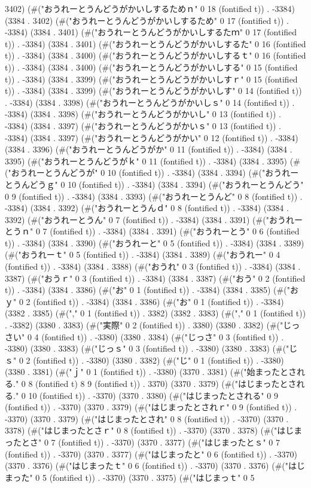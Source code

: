 3402) (#("おうれーとうんどうがかいしするためｎ" 0 18 (fontified t)) . -3384) (3384 . 3402) (#("おうれーとうんどうがかいしするため" 0 17 (fontified t)) . -3384) (3384 . 3401) (#("おうれーとうんどうがかいしするたｍ" 0 17 (fontified t)) . -3384) (3384 . 3401) (#("おうれーとうんどうがかいしするた" 0 16 (fontified t)) . -3384) (3384 . 3400) (#("おうれーとうんどうがかいしするｔ" 0 16 (fontified t)) . -3384) (3384 . 3400) (#("おうれーとうんどうがかいしする" 0 15 (fontified t)) . -3384) (3384 . 3399) (#("おうれーとうんどうがかいしすｒ" 0 15 (fontified t)) . -3384) (3384 . 3399) (#("おうれーとうんどうがかいしす" 0 14 (fontified t)) . -3384) (3384 . 3398) (#("おうれーとうんどうがかいしｓ" 0 14 (fontified t)) . -3384) (3384 . 3398) (#("おうれーとうんどうがかいし" 0 13 (fontified t)) . -3384) (3384 . 3397) (#("おうれーとうんどうがかいｓ" 0 13 (fontified t)) . -3384) (3384 . 3397) (#("おうれーとうんどうがかい" 0 12 (fontified t)) . -3384) (3384 . 3396) (#("おうれーとうんどうがか" 0 11 (fontified t)) . -3384) (3384 . 3395) (#("おうれーとうんどうがｋ" 0 11 (fontified t)) . -3384) (3384 . 3395) (#("おうれーとうんどうが" 0 10 (fontified t)) . -3384) (3384 . 3394) (#("おうれーとうんどうｇ" 0 10 (fontified t)) . -3384) (3384 . 3394) (#("おうれーとうんどう" 0 9 (fontified t)) . -3384) (3384 . 3393) (#("おうれーとうんど" 0 8 (fontified t)) . -3384) (3384 . 3392) (#("おうれーとうんｄ" 0 8 (fontified t)) . -3384) (3384 . 3392) (#("おうれーとうん" 0 7 (fontified t)) . -3384) (3384 . 3391) (#("おうれーとうｎ" 0 7 (fontified t)) . -3384) (3384 . 3391) (#("おうれーとう" 0 6 (fontified t)) . -3384) (3384 . 3390) (#("おうれーと" 0 5 (fontified t)) . -3384) (3384 . 3389) (#("おうれーｔ" 0 5 (fontified t)) . -3384) (3384 . 3389) (#("おうれー" 0 4 (fontified t)) . -3384) (3384 . 3388) (#("おうれ" 0 3 (fontified t)) . -3384) (3384 . 3387) (#("おうｒ" 0 3 (fontified t)) . -3384) (3384 . 3387) (#("おう" 0 2 (fontified t)) . -3384) (3384 . 3386) (#("お" 0 1 (fontified t)) . -3384) (3384 . 3385) (#("おｙ" 0 2 (fontified t)) . -3384) (3384 . 3386) (#("お" 0 1 (fontified t)) . -3384) (3382 . 3385) (#("," 0 1 (fontified t)) . 3382) (3382 . 3383) (#("," 0 1 (fontified t)) . -3382) (3380 . 3383) (#("実際" 0 2 (fontified t)) . 3380) (3380 . 3382) (#("じっさい" 0 4 (fontified t)) . -3380) (3380 . 3384) (#("じっさ" 0 3 (fontified t)) . -3380) (3380 . 3383) (#("じっｓ" 0 3 (fontified t)) . -3380) (3380 . 3383) (#("じｓ" 0 2 (fontified t)) . -3380) (3380 . 3382) (#("じ" 0 1 (fontified t)) . -3380) (3380 . 3381) (#("ｊ" 0 1 (fontified t)) . -3380) (3370 . 3381) (#("始まったとされる." 0 8 (fontified t) 8 9 (fontified t)) . 3370) (3370 . 3379) (#("はじまったとされる." 0 10 (fontified t)) . -3370) (3370 . 3380) (#("はじまったとされる" 0 9 (fontified t)) . -3370) (3370 . 3379) (#("はじまったとされｒ" 0 9 (fontified t)) . -3370) (3370 . 3379) (#("はじまったとされ" 0 8 (fontified t)) . -3370) (3370 . 3378) (#("はじまったとさｒ" 0 8 (fontified t)) . -3370) (3370 . 3378) (#("はじまったとさ" 0 7 (fontified t)) . -3370) (3370 . 3377) (#("はじまったとｓ" 0 7 (fontified t)) . -3370) (3370 . 3377) (#("はじまったと" 0 6 (fontified t)) . -3370) (3370 . 3376) (#("はじまったｔ" 0 6 (fontified t)) . -3370) (3370 . 3376) (#("はじまった" 0 5 (fontified t)) . -3370) (3370 . 3375) (#("はじまっｔ" 0 5 